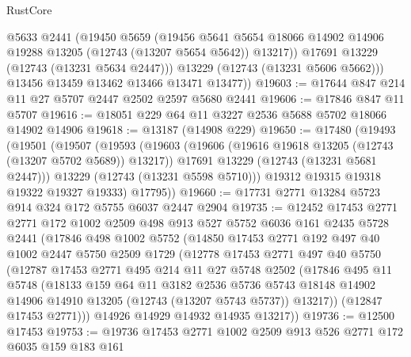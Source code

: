 \begin{lexlean}{RustCore}
\begin{coremodule}
            @5633
            @2441
            (@19450
              @5659
              (@19456
                @5641
                @5654
                @18066
                @14902
                @14906
                @19288
                @13205
                (@12743 (@13207 @5654 @5642))
                @13217))
            @17691
            @13229
            (@12743 (@13231 @5634 @2447)))
          @13229
          (@12743 (@13231 @5606 @5662)))
        @13456
        @13459
        @13462
        @13466
        @13471
        @13477))
@19603 := @17644 @847 @214 @11 @27 @5707 @2447 @2502 @2597 @5680 @2441
@19606 := @17846 @847 @11 @5707
@19616 := @18051 @229 @64 @11 @3227 @2536 @5688 @5702 @18066 @14902 @14906
@19618 := @13187 (@14908 @229)
@19650 := @17480
    (@19493
      (@19501
        (@19507
          (@19593
            (@19603
              (@19606 (@19616 @19618 @13205 (@12743 (@13207 @5702 @5689)) @13217))
              @17691
              @13229
              (@12743 (@13231 @5681 @2447)))
            @13229
            (@12743 (@13231 @5598 @5710)))
          @19312
          @19315
          @19318
          @19322
          @19327
          @19333)
        @17795))
@19660 := @17731 @2771 @13284 @5723 @914 @324 @172 @5755 @6037 @2447 @2904
@19735 := @12452
    @17453
    @2771
    @2771
    @172
    @1002
    @2509
    @498
    @913
    @527
    @5752
    @6036
    @161
    @2435
    @5728
    @2441
    (@17846
      @498
      @1002
      @5752
      (@14850
        @17453
        @2771
        @192
        @497
        @40
        @1002
        @2447
        @5750
        @2509
        @1729
        (@12778
          @17453
          @2771
          @497
          @40
          @5750
          (@12787
            @17453
            @2771
            @495
            @214
            @11
            @27
            @5748
            @2502
            (@17846
              @495
              @11
              @5748
              (@18133
                @159
                @64
                @11
                @3182
                @2536
                @5736
                @5743
                @18148
                @14902
                @14906
                @14910
                @13205
                (@12743 (@13207 @5743 @5737))
                @13217))
            (@12847 @17453 @2771)))
        @14926
        @14929
        @14932
        @14935
        @13217))
@19736 := @12500 @17453
@19753 := @19736
    @17453
    @2771
    @1002
    @2509
    @913
    @526
    @2771
    @172
    @6035
    @159
    @183
    @161

\end{coremodule}
\end{lexlean}
